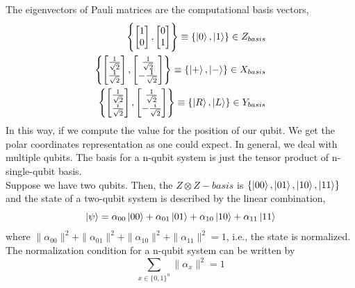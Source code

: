 The eigenvectors of Pauli matrices are the computational basis vectors,
\begin{align*}
    \Biggl\{\begin{bmatrix}
           1 \\
           0 
         \end{bmatrix}, \begin{bmatrix}
           0 \\
           1 
         \end{bmatrix} \Biggr\}\equiv \{\ket{0}, \ket{1}\} \in Z_{basis} \\
         \Biggl\{\begin{bmatrix}
           \frac{1}{\sqrt{2}} \\
           \frac{1}{\sqrt{2}} 
         \end{bmatrix}, \begin{bmatrix}
           \frac{1}{\sqrt{2}} \\
           -\frac{1}{\sqrt{2}} 
         \end{bmatrix} \Biggr\}\equiv \{\ket{+}, \ket{-}\} \in X_{basis} \\
         \Biggl\{\begin{bmatrix}
           \frac{1}{\sqrt{2}} \\
           \frac{i}{\sqrt{2}} 
         \end{bmatrix}, \begin{bmatrix}
           \frac{1}{\sqrt{2}} \\
           -\frac{i}{\sqrt{2}} 
         \end{bmatrix} \Biggr\}\equiv \{\ket{R}, \ket{L}\} \in Y_{basis}
\end{align*}
In this way, if we compute the value for the position of our qubit. We get the polar coordinates representation as one could expect.
In general, we deal with multiple qubits. The basis for a n-qubit system is just the tensor product of n-single-qubit basis.\\
Suppose we have two qubits. Then, the $Z\otimes Z-basis$ is $\{\ket{00},\ket{01},\ket{10},\ket{11}\}$ and the state of a two-qubit system is described by the linear combination,
\begin{equation}
    \ket{\psi} = \alpha_{00}\ket{00} +\alpha_{01}\ket{01} +\alpha_{10}\ket{10} +\alpha_{11}\ket{11}
\end{equation}
where $\|\alpha_{00}\|^{2} + \|\alpha_{01}\|^{2} + \|\alpha_{10}\|^{2} + \|\alpha_{11}\|^{2} = 1$, i.e., the state is normalized.\\
The normalization condition for a n-qubit system can be written by
\begin{equation}
\sum_{x\in \{0,1\}^{n}}\|\alpha_{x}\|^{2} = 1
\end{equation}
